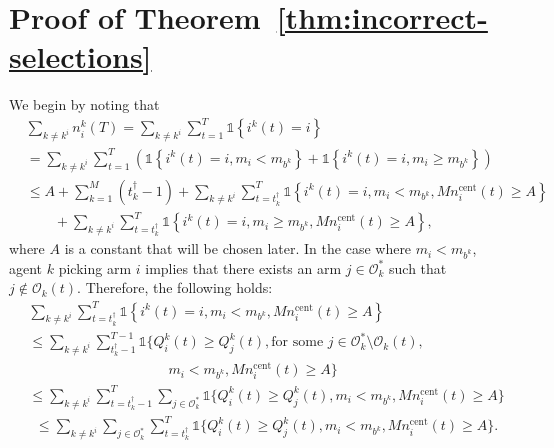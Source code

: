 \documentclass[final,5p,times,twocolumn]{elsarticle}
\theoremstyle{definition}
\def \mc {\mathcal}
\begin{document}
  \section{Proof of Theorem~\ref{thm:incorrect-selections}}\label{app:proof-thm3}
  	We begin by noting that
	\begin{align}
&	\sum_{k \neq k^i}  n_i^k(T)  = \sum_{k \neq k^i}  \sum_{t=1}^{T} \mathds{1} \left\{ i^k(t) = i \right\} \nonumber \\
	& = \sum_{k \neq k^i}  \sum_{t=1}^{T} {\left( \mathds{1} \left\{ i^k(t) = i, m_i < m_{b^k} \right\} %
	+ 
	\mathds{1} \left\{ i^k(t) = i, m_i \geq m_{b^k} \right\} \right)} \nonumber \\
	& \leq A \!+ \! \sum_{k=1}^M (t_k^\dag -1) %
	+ \sum_{k \neq k^i}  \sum_{t=t_k^\dag}^{T} \mathds{1} \left\{ i^k(t) = i, m_i < m_{b^k}, Mn_i^{\text{cent}}(t) \geq A \right\} \nonumber \\
	& \qquad + \sum_{k \neq k^i} \sum_{t=t_k^\dag}^{T} \mathds{1} \left\{ i^k(t) = i, m_i \geq m_{b^k}, Mn_i^{\text{cent}}(t) \geq A \right\}, \label{eqn:col_mainsplitting}
	\end{align}
	where $A$ is a constant that will be chosen later.  
	In the case where $m_i < m_{b^k}$, agent $k$ picking arm $i$ implies that there exists an arm $j \in \mathcal{O}_{k}^*$ such that $j \notin \mathcal{O}_{k}(t)$.  Therefore, the following holds:
	\begin{align}
		&\sum_{k \neq k^i}  \sum_{t=t_k^\dag}^{{T}} \mathds{1} \left\{ i^k(t) = i, m_i < m_{b^k}, Mn_i^{\text{cent}}(t) \geq A \right\} \nonumber \\
		& \leq \sum_{k \neq k^i}  \sum_{t_k^\dag-1}^{T-1} \mathds{1} \big\{ Q_i^k(t) \geq Q_j^k(t), \text{for some } j \in \mc O_k^*\setminus \mc O_k(t),  \nonumber \\ 
		& \qquad \qquad \qquad \qquad \qquad  m_i < m_{b^k}, Mn_i^{\text{cent}}(t) \geq A \big\} \nonumber \\
		& \leq \sum_{k \neq k^i}  \sum_{t=t_k^\dag-1}^{T} \sum_{j \in \mathcal{O}_{k}^*} \mathds{1} \big\{ Q_i^k(t) \geq Q_j^k(t),  m_i < m_{b^k}, Mn_i^{\text{cent}}(t) \geq A \big\} \nonumber 
				\end{align}
\begin{align}
		& \leq \sum_{k \neq k^i}   \sum_{j \in \mathcal{O}_{k}^*} \sum_{t=t_k^\dag}^{T} \mathds{1} \big\{ Q_i^k(t) \geq Q_j^k(t),  m_i < m_{b^k}, Mn_i^{\text{cent}}(t) \geq A \big\} \nonumber .
	\end{align}
	
\end{document}
